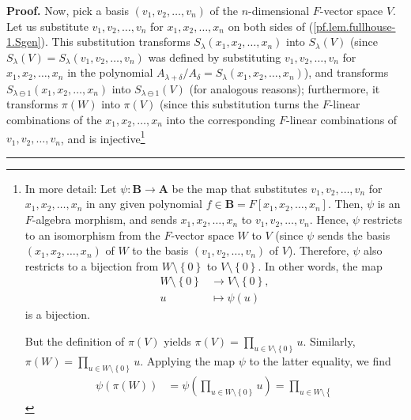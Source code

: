 \documentclass[numbers=enddot,12pt,final,onecolumn,notitlepage]{scrartcl}%
\numberwithin{exer}{section}
\theoremstyle{definition}
\newenvironment{proof}[1][Proof]{\noindent\textbf{#1.} }{\ \rule{0.5em}{0.5em}}
\let\prodnonlimits\prod
\renewcommand{\prod}{\prodnonlimits\limits}
\theoremstyle{plainsl}
\begin{document}
\begin{proof}
Now, pick a basis $\left(  v_{1},v_{2},\ldots,v_{n}\right)  $ of the
$n$-dimensional $F$-vector space $V$. Let us substitute $v_{1},v_{2}%
,\ldots,v_{n}$ for $x_{1},x_{2},\ldots,x_{n}$ on both sides of
(\ref{pf.lem.fullhouse-1.Sgen}). This substitution transforms $S_{\lambda
}\left(  x_{1},x_{2},\ldots,x_{n}\right)  $ into $S_{\lambda}\left(  V\right)
$ (since $S_{\lambda}\left(  V\right)  =S_{\lambda}\left(  v_{1},v_{2}%
,\ldots,v_{n}\right)  $ was defined by substituting $v_{1},v_{2},\ldots,v_{n}$
for $x_{1},x_{2},\ldots,x_{n}$ in the polynomial $A_{\lambda+\delta}%
/A_{\delta}=S_{\lambda}\left(  x_{1},x_{2},\ldots,x_{n}\right)  $), and
transforms $S_{\lambda\ominus1}\left(  x_{1},x_{2},\ldots,x_{n}\right)  $ into
$S_{\lambda\ominus1}\left(  V\right)  $ (for analogous reasons); furthermore,
it transforms $\pi\left(  W\right)  $ into $\pi\left(  V\right)  $ (since this
substitution turns the $F$-linear combinations of the $x_{1},x_{2}%
,\ldots,x_{n}$ into the corresponding $F$-linear combinations of $v_{1}%
,v_{2},\ldots,v_{n}$, and is injective\footnote{In more detail: Let
$\psi:\mathbf{B}\rightarrow\mathbf{A}$ be the map that substitutes
$v_{1},v_{2},\ldots,v_{n}$ for $x_{1},x_{2},\ldots,x_{n}$ in any given
polynomial $f\in\mathbf{B}=F\left[  x_{1},x_{2},\ldots,x_{n}\right]  $. Then,
$\psi$ is an $F$-algebra morphism, and sends $x_{1},x_{2},\ldots,x_{n}$ to
$v_{1},v_{2},\ldots,v_{n}$. Hence, $\psi$ restricts to an isomorphism from the
$F$-vector space $W$ to $V$ (since $\psi$ sends the basis $\left(  x_{1}%
,x_{2},\ldots,x_{n}\right)  $ of $W$ to the basis $\left(  v_{1},v_{2}%
,\ldots,v_{n}\right)  $ of $V$). Therefore, $\psi$ also restricts to a
bijection from $W\setminus\left\{  0\right\}  $ to $V\setminus\left\{
0\right\}  $. In other words, the map%
\begin{align}
W\setminus\left\{  0\right\}   &  \rightarrow V\setminus\left\{  0\right\}
,\nonumber\\
u  &  \mapsto\psi\left(  u\right)  \label{pf.lem.fullhouse-1.fnc.1}%
\end{align}
is a bijection.
\par
But the definition of $\pi\left(  V\right)  $ yields $\pi\left(  V\right)
=\prod_{u\in V\setminus\left\{  0\right\}  }u$. Similarly, $\pi\left(
W\right)  =\prod_{u\in W\setminus\left\{  0\right\}  }u$. Applying the map
$\psi$ to the latter equality, we find%
\begin{align*}
\psi\left(  \pi\left(  W\right)  \right)   &  =\psi\left(  \prod_{u\in
W\setminus\left\{  0\right\}  }u\right)  =\prod_{u\in W\setminus\left\{
}
\end{align*}}
\end{proof}
\end{document}
